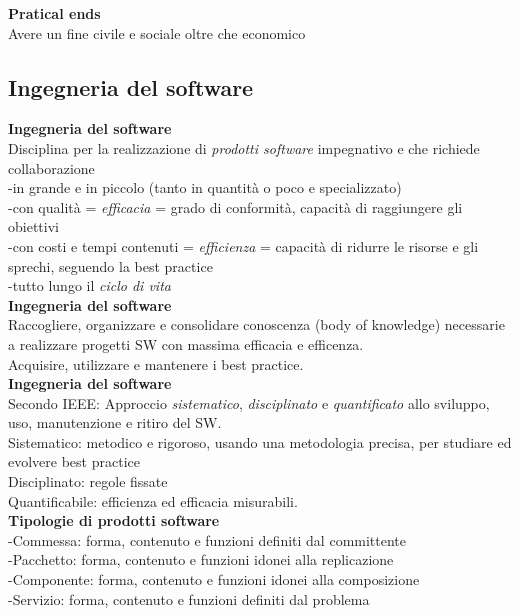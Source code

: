 \documentclass{article}
\begin{document}
		\textbf{Pratical ends}\\
		Avere un fine civile e sociale oltre che economico\\
		
	\subsection{Ingegneria del software}
		\textbf{Ingegneria del software}\\
		Disciplina per la realizzazione di \textit{prodotti software} impegnativo e che richiede collaborazione\\
		-in grande e in piccolo (tanto in quantità o poco e specializzato)\\
		-con qualità = \textit{efficacia} = grado di conformità, capacità di raggiungere gli obiettivi\\
		-con costi e tempi contenuti = \textit{efficienza} = capacità di ridurre le risorse e gli sprechi, seguendo la best practice \\
		-tutto lungo il \textit{ciclo di vita}\\
		
		\textbf{Ingegneria del software}\\
		Raccogliere, organizzare e consolidare conoscenza (body of knowledge) necessarie a realizzare progetti SW con massima efficacia e efficenza.\\
		Acquisire, utilizzare e mantenere i best practice.\\
		
		
		\textbf{Ingegneria del software}\\
		Secondo IEEE: Approccio \textit{sistematico}, \textit{disciplinato} e \textit{quantificato} allo sviluppo, uso, manutenzione e ritiro del SW.\\
		Sistematico: metodico e rigoroso, usando una metodologia precisa, per studiare ed evolvere best practice\\
		Disciplinato: regole fissate\\
		Quantificabile: efficienza ed efficacia misurabili.\\
		
		
		\textbf{Tipologie di prodotti software}\\
		-Commessa: forma, contenuto e funzioni definiti dal committente\\
		-Pacchetto: forma, contenuto e funzioni idonei alla replicazione\\
		-Componente: forma, contenuto e funzioni idonei alla composizione\\
		-Servizio: forma, contenuto e funzioni definiti dal problema\\
		
\end{document}

